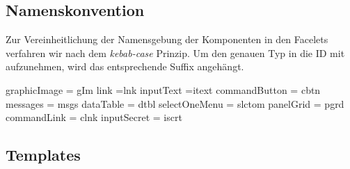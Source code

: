 \newcommand{\ftable}[1]{\begin{sidewaystable}
\begin{tabular}[H]{ |m{1.5cm}| m{1.5cm}| m{3cm}| m{7cm} |m{4cm}| m{4cm}| }
    \toprule
    \textbf{ID} & \textbf{Typ} & \textbf{Beschreibung} & \textbf{Binding} & \textbf{Constraints} & \textbf{Validator \newline Converter} \\
    \midrule
    #1
\end{tabular}
\end{sidewaystable}
}

\newcommand{\fentry}[6]{\footnotesize#1 &\footnotesize#2 &\footnotesize#3 &\footnotesize#4 &\footnotesize#5 &\footnotesize#6\\\hline}


\subsection{Namenskonvention}

Zur Vereinheitlichung der Namensgebung der Komponenten in den Facelets verfahren wir nach dem \emph{kebab-case} Prinzip. Um den genauen Typ in die ID mit aufzunehmen, wird das entsprechende Suffix angehängt.

 graphicImage = gIm link =lnk inputText =itext commandButton = cbtn messages = msgs dataTable = dtbl selectOneMenu = slctom panelGrid = pgrd commandLink = clnk inputSecret = iscrt

\subsection{Templates}

